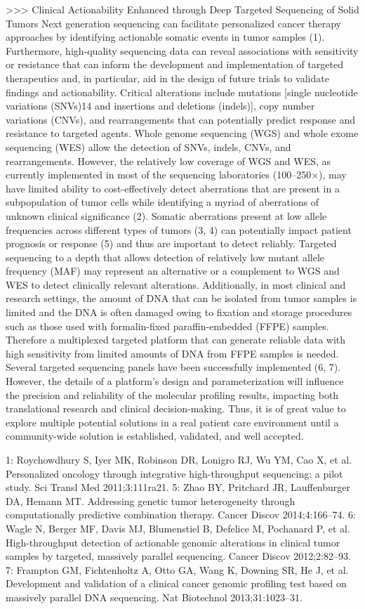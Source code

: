>>> Clinical Actionability Enhanced through Deep Targeted Sequencing of Solid Tumors
Next generation sequencing can facilitate personalized cancer therapy approaches by identifying actionable somatic events in tumor samples (1). Furthermore, high-quality sequencing data can reveal associations with sensitivity or resistance that can inform the development and implementation of targeted therapeutics and, in particular, aid in the design of future trials to validate findings and actionability. Critical alterations include mutations [single nucleotide variations (SNVs)14 and insertions and deletions (indels)], copy number variations (CNVs), and rearrangements that can potentially predict response and resistance to targeted agents. Whole genome sequencing (WGS) and whole exome sequencing (WES) allow the detection of SNVs, indels, CNVs, and rearrangements. However, the relatively low coverage of WGS and WES, as currently implemented in most of the sequencing laboratories (100–250×), may have limited ability to cost-effectively detect aberrations that are present in a subpopulation of tumor cells while identifying a myriad of aberrations of unknown clinical significance (2). Somatic aberrations present at low allele frequencies across different types of tumors (3, 4) can potentially impact patient prognosis or response (5) and thus are important to detect reliably. Targeted sequencing to a depth that allows detection of relatively low mutant allele frequency (MAF) may represent an alternative or a complement to WGS and WES to detect clinically relevant alterations. Additionally, in most clinical and research settings, the amount of DNA that can be isolated from tumor samples is limited and the DNA is often damaged owing to fixation and storage procedures such as those used with formalin-fixed paraffin-embedded (FFPE) samples. Therefore a multiplexed targeted platform that can generate reliable data with high sensitivity from limited amounts of DNA from FFPE samples is needed. Several targeted sequencing panels have been successfully implemented (6, 7). However, the details of a platform's design and parameterization will influence the precision and reliability of the molecular profiling results, impacting both translational research and clinical decision-making. Thus, it is of great value to explore multiple potential solutions in a real patient care environment until a community-wide solution is established, validated, and well accepted.

1: Roychowdhury S, Iyer MK, Robinson DR, Lonigro RJ, Wu YM, Cao X, et al. Personalized oncology through integrative high-throughput sequencing: a pilot study. Sci Transl Med 2011;3:111ra21.
5: Zhao BY, Pritchard JR, Lauffenburger DA, Hemann MT. Addressing genetic tumor heterogeneity through computationally predictive combination therapy. Cancer Discov 2014;4:166–74.
6: Wagle N, Berger MF, Davis MJ, Blumenstiel B, Defelice M, Pochanard P, et al. High-throughput detection of actionable genomic alterations in clinical tumor samples by targeted, massively parallel sequencing. Cancer Discov 2012;2:82–93.
7: Frampton GM, Fichtenholtz A, Otto GA, Wang K, Downing SR, He J, et al. Development and validation of a clinical cancer genomic profiling test based on massively parallel DNA sequencing. Nat Biotechnol 2013;31:1023–31.


